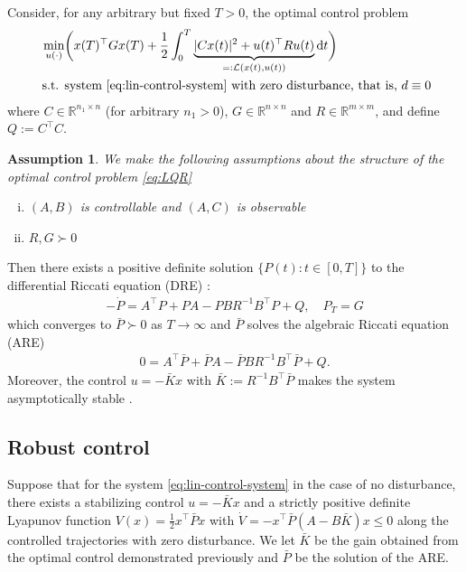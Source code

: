 \documentclass[letterpaper, 10 pt, conference]{ieeeconf}  %
\newtheorem{assumption}{Assumption}
\newcommand{\tp}{^\top}
\newcommand{\inv}{^{-1}}
\newcommand{\R}{\mathbb{R}}
\newcommand{\half}{\frac{1}{2}}
\newcommand{\ud}{\mathrm{d}}
\renewcommand{\L}{\mathcal{L}}
\begin{document}
Consider, for any arbitrary but fixed $T > 0$, the optimal control problem
\begin{subequations}
\begin{align}
\min_{u(\cdot)} & \bigg( x(T) \tp G x(T) + \half\int_{0}^{T} \underbrace{|Cx(t)|^2 + u(t)\tp R u(t)}_{=: \L(x(t),u(t))} \ud t \bigg)  \\
\text{ s.t. } & \text{system }\eqref{eq:lin-control-system} \text{ with zero disturbance, that is, } d \equiv 0
\end{align}
\label{eq:LQR}
\end{subequations}
where $C \in \R^{n_1 \times n}$ (for arbitrary $n_1 > 0$), $G \in \R^{n \times n}$ and $R \in \R^{m \times m}$, and  define $Q := C\tp C$. 
\begin{assumption}
We make the following assumptions about the structure of the optimal control problem \eqref{eq:LQR}
\begin{enumerate}[(i)]
\item $(A,B)$ is controllable and $(A,C)$ is observable
\item $R,G \succ 0$
\end{enumerate}

\end{assumption}
Then there exists a positive definite solution $\{P(t) : t \in [0,T]\}$ to the differential Riccati equation (DRE) \cite[Chapter 3]{k-sivan}:
\begin{align*}
-\dot{P} = A\tp P + PA - PBR\inv B\tp P + Q, \quad P_T = G
\end{align*}
which converges to $\bar{P} \succ 0$ as $T \to \infty$ and $\bar{P}$ solves the algebraic Riccati equation (ARE)
\begin{align*}
0 = A\tp \bar{P} + \bar{P}A - \bar{P}BR\inv B\tp \bar{P} + Q.
\end{align*}
Moreover, the control $u = -\bar{K}x$ with $\bar{K} := R\inv B\tp \bar{P}$ makes the system asymptotically stable \cite[Theorem 3.7]{k-sivan}. 

\subsection{Robust control}

Suppose that for the system \eqref{eq:lin-control-system} in the case of no disturbance, there exists a stabilizing control $u = -\bar{K}x$ and a strictly positive definite Lyapunov function $V(x) = \half x\tp \bar{P} x$ with $\dot{V} = -x\tp \bar{P}(A - B\bar{K})x \le 0$ along the controlled trajectories with zero disturbance. We let $\bar{K}$ be the gain obtained from the optimal control demonstrated previously and $\bar{P}$ be the solution of the ARE.  
\end{document}
